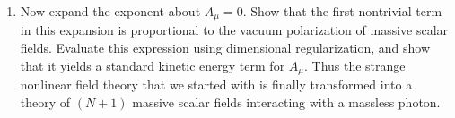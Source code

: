 \begin{enumerate}[label=(\alph*)]
    where we have kept only the leading terms for $N\to\infty$,
    $g^2N$ fixed.  Using methods similar to those we used for the nonlinear
    sigma model, examine the conditions for minimizing the exponent with
    respect to $\lambda$ and $A_\mu$.  Show that these conditions have a
    solution at $A_\mu = 0$ and $\lambda = m^2 > 0$.  Show that, if $g^2$ is
    renormalized at the scale $M$, $m$ can be written as
    \begin{equation}
      m = M\ \exp\Bigl( -\frac{2\pi}{Ng^2} \Bigr) .
    \end{equation}
  \item Now expand the exponent about $A_\mu = 0$.  Show that the first
    nontrivial term in this expansion is proportional to the vacuum
    polarization of massive scalar fields.  Evaluate this expression using
    dimensional regularization, and show that it yields a standard kinetic
    energy term for $A_\mu$.  Thus the strange nonlinear field theory that we
    started with is finally transformed into a theory of $(N+1)$ massive
    scalar fields interacting with a massless photon.
\end{enumerate}
